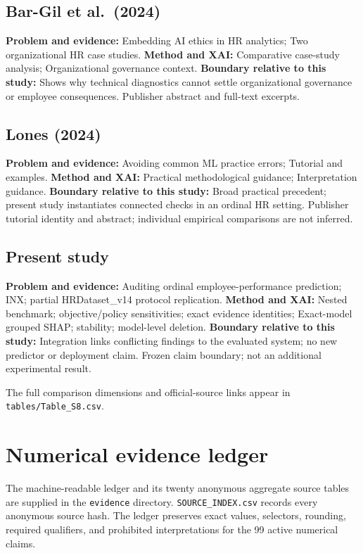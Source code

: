 \documentclass[
  a4paper,
  review]{elsarticle}
\begin{document}
\subsection{Bar-Gil et al.~(2024)}\label{bar-gil-et-al.-2024}

\textbf{Problem and evidence:} Embedding AI ethics in HR analytics; Two
organizational HR case studies. \textbf{Method and XAI:} Comparative
case-study analysis; Organizational governance context. \textbf{Boundary
relative to this study:} Shows why technical diagnostics cannot settle
organizational governance or employee consequences. Publisher abstract
and full-text excerpts.

\subsection{Lones (2024)}\label{lones-2024}

\textbf{Problem and evidence:} Avoiding common ML practice errors;
Tutorial and examples. \textbf{Method and XAI:} Practical methodological
guidance; Interpretation guidance. \textbf{Boundary relative to this
study:} Broad practical precedent; present study instantiates connected
checks in an ordinal HR setting. Publisher tutorial identity and
abstract; individual empirical comparisons are not inferred.

\subsection{Present study}\label{present-study}

\textbf{Problem and evidence:} Auditing ordinal employee-performance
prediction; INX; partial HRDataset\_v14 protocol replication.
\textbf{Method and XAI:} Nested benchmark; objective/policy
sensitivities; exact evidence identities; Exact-model grouped SHAP;
stability; model-level deletion. \textbf{Boundary relative to this
study:} Integration links conflicting findings to the evaluated system;
no new predictor or deployment claim. Frozen claim boundary; not an
additional experimental result.

The full comparison dimensions and official-source links appear in
\texttt{tables/Table\_S8.csv}.

\section{Numerical evidence ledger}\label{numerical-evidence-ledger}

The machine-readable ledger and its twenty anonymous aggregate source
tables are supplied in the \texttt{evidence} directory.
\texttt{SOURCE\_INDEX.csv} records every anonymous source hash. The
ledger preserves exact values, selectors, rounding, required qualifiers,
and prohibited interpretations for the 99 active numerical claims.
\end{document}
